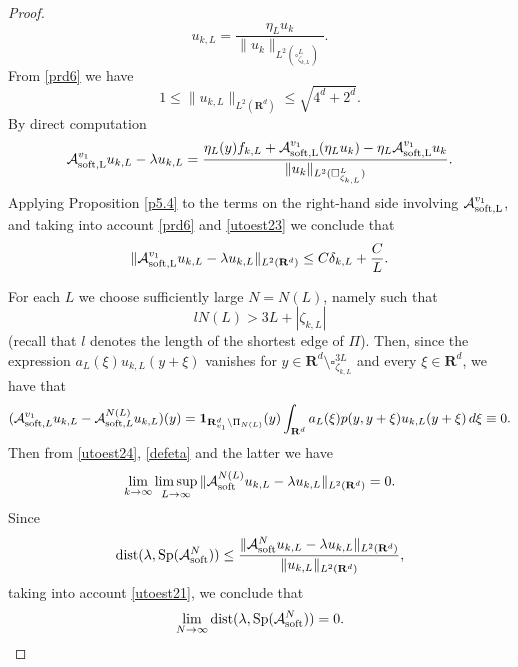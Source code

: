 \documentclass[11pt]{article}
\newcommand\soft{{\rm soft}}
\def\RR{\R}
\newcommand{\R}{\mathbf{R}}
\def\AA{\mathcal{A}}
\DeclareMathOperator{\Sp}{Sp}
\theoremstyle{remark}
\begin{document}
\begin{proof}
\begin{equation}
		u_{k,L} =\frac{\eta_L  u_k}{\|u_k\|_{L^2(\square^L_{\zeta_{k,L} })}}.
	\end{equation}	
	From \eqref{prd6} we have
	\begin{equation} \label{utoest21}
		1 \leq \|u_{k,L}\|_{L^2(\mathbf{R}^d)} \leq \sqrt{4^d+  2^d}.
	\end{equation}
	By direct computation
	\begin{equation*}%
		\mathcal{A}_{\rm soft,L}^{v_1} u_{k,L}-\lambda u_{k,L}
		 = \frac{\eta_L(y)f_{k,L} + \mathcal{A}_{\rm soft,L}^{v_1} (\eta_L u_k)  - \eta_L    \mathcal{A}_{\rm soft,L}^{v_1} u_k }{\|u_k\|_{L^2(\square^L_{\zeta_{k,L}})}}  .
	\end{equation*}
Applying Proposition \ref{p5.4} to the terms on the right-hand side involving 	$\mathcal{A}_{\rm soft,L}^{v_1}$, and taking into account \eqref{prd6} and \eqref{utoest23}
 we conclude that
	\begin{equation} \label{utoest24}
		\| \mathcal{A}_{\rm soft,L}^{v_1} u_{k,L}-\lambda u_{k,L}\|_{L^2(\RR^d)} \leq C \delta_{k,L} + \frac{C}{L}.
	\end{equation}
	
	
	
	


For each $L$ we choose sufficiently large $N = N(L)$, namely such that
\begin{equation}\label{104a}
	lN(L) >3L+ |\zeta_{k,L}|
\end{equation}
   (recall that $l$ denotes the length of the shortest edge of $\Pi$). Then, since the expression
$a_L (\xi) u_{k,L}(y+\xi)$ vanishes for  $y \in \R^d \setminus\square^{3L}_{\zeta_{k,L}} $  and every $\xi \in \mathbf{R}^d$,  we have that
\begin{equation*}
		(\AA_{\soft,L} ^{v_1}u_{k,L} -\AA_{\soft,L}^{N(L)}  u_{k,L})(y) = \mathbf{1}_{\mathbf{R}^d_{v_1}\backslash \Pi_{N(L)}} (y) \int_{\R^d}  a_L(\xi) p(y,y+\xi) u_{k,L}(y+\xi) \, d\xi \equiv 0 	.
\end{equation*}
Then from   \eqref{utoest24}, \eqref{defeta} and the latter we have
	\begin{equation} \label{ana1}
		 \lim_{k \to \infty} \limsup_{L\to \infty}   \|\AA_\soft^{N(L)} u_{k,L} -\lambda u_{k,L}\|_{L^2(\RR^d)}=0.   	
	\end{equation} 	
	Since
	\begin{equation*}%
		\textrm{dist} (\lambda,\Sp (\AA_\soft^N) ) \leq \frac{\|\AA_\soft^N u_{k,L} -\lambda u_{k,L}\|_{L^2(\RR^d)}}{\|u_{k,L}\|_{L^2(\RR^d)}}, 	
	\end{equation*} 	
	taking into account \eqref{utoest21}, we conclude that
	\begin{equation*}
		\lim_{N \to \infty} \textrm{dist}  (\lambda,\Sp (\AA_\soft^N) )=0.
	\end{equation*}
	

\end{proof}
\end{document}
